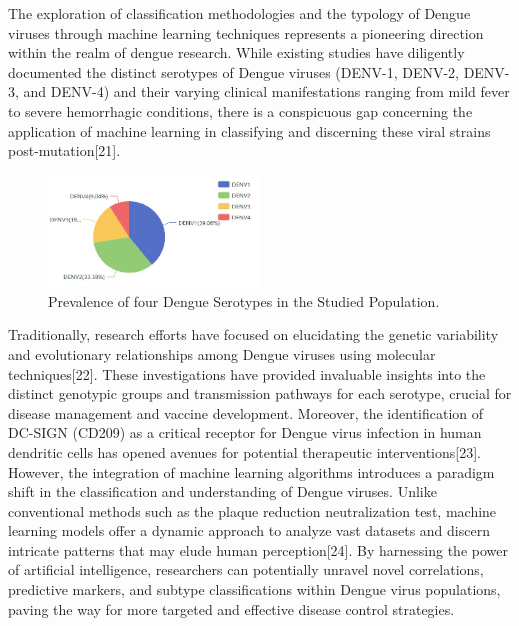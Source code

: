 \documentclass[conference]{IEEEtran}
\begin{document}
The exploration of classification methodologies and the typology of
Dengue viruses through machine learning techniques represents a pioneering
direction within the realm of dengue research. While existing studies have
diligently documented the distinct serotypes of Dengue viruses (DENV-1, DENV-2, DENV-3, and DENV-4)
and their varying clinical manifestations ranging from mild fever to severe hemorrhagic conditions,
there is a conspicuous gap concerning the application of machine learning in classifying and
discerning these viral strains post-mutation[21]. \\

\begin{figure}[htbp]
    \centering
    \includegraphics[width=0.5\textwidth]{fig4.png}
    \caption{Prevalence of four Dengue Serotypes in the Studied Population.}
\end{figure}

Traditionally, research efforts have focused on elucidating the genetic variability and
evolutionary relationships among Dengue viruses using molecular techniques[22]. These investigations
have provided invaluable insights into the distinct genotypic groups and transmission pathways
for each serotype, crucial for disease management and vaccine development. Moreover, the
identification of DC-SIGN (CD209) as a critical receptor for Dengue virus infection in human
dendritic cells has opened avenues for potential therapeutic interventions[23]. \\

However, the integration of machine learning algorithms introduces a paradigm shift in the
classification and understanding of Dengue viruses. Unlike conventional methods such as the
plaque reduction neutralization test, machine learning models offer a dynamic approach to
analyze vast datasets and discern intricate patterns that may elude human perception[24]. By
harnessing the power of artificial intelligence, researchers can potentially unravel novel
correlations, predictive markers, and subtype classifications within Dengue virus populations,
paving the way for more targeted and effective disease control strategies. \\
\end{document}
